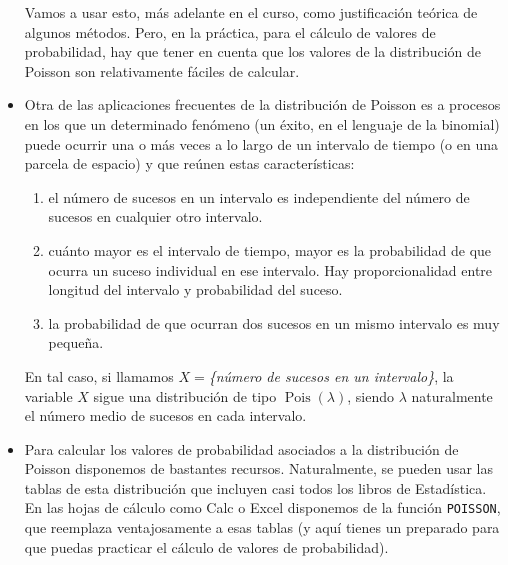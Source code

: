 \begin{itemize}

         Vamos a usar esto, más adelante en el curso, como justificación teórica de algunos métodos. Pero, en la práctica, para el cálculo de valores de probabilidad, hay que tener en cuenta que los valores de la distribución de Poisson son relativamente fáciles de calcular.


  \item Otra de las aplicaciones frecuentes de la distribución de Poisson es a procesos en los que un determinado fenómeno (un éxito, en el lenguaje de la binomial) puede ocurrir una o más veces a lo largo de un intervalo de tiempo (o en una parcela de espacio) y que reúnen estas características:
      \begin{enumerate}
        \item el número de sucesos en un intervalo es independiente del número de sucesos en cualquier otro intervalo.
        \item cuánto mayor es el intervalo de tiempo, mayor es la probabilidad de que ocurra un suceso individual en ese intervalo. Hay proporcionalidad entre longitud del intervalo y probabilidad del suceso.
        \item la probabilidad de que ocurran dos sucesos en un mismo intervalo es muy pequeña.
      \end{enumerate}
      En tal caso, si llamamos $X=${\em \{número de sucesos en un intervalo\}}, la variable $X$ sigue una distribución de tipo $\operatorname{Pois}(\lambda)$, siendo $\lambda$ naturalmente el número medio de sucesos en cada intervalo.

  \item Para calcular los valores de probabilidad asociados a la distribución de Poisson disponemos de bastantes recursos. Naturalmente, se pueden usar las tablas de esta distribución que incluyen casi todos los libros de Estadística. En las hojas de cálculo como Calc o Excel disponemos de la función {\tt POISSON}, que reemplaza ventajosamente a esas tablas (y aquí tienes un  preparado para que puedas practicar el cálculo de valores de probabilidad).


\end{itemize}
